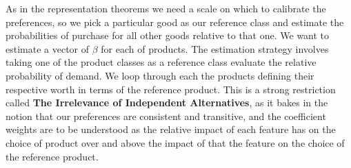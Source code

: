\documentclass[]{tufte-book}
\theoremstyle{definition}
\theoremstyle{definition}
\theoremstyle{definition}
\theoremstyle{remark}
\begin{document}
As in the representation theorems we need a scale on which to calibrate the preferences, so we pick a particular good as our reference class and estimate the probabilities of purchase for all other goods relative to that one. We want to estimate a vector of \(\beta\) for each of products. The estimation strategy involves taking one of the product classes as a reference class evaluate the relative probability of demand. We loop through each the products defining their respective worth in terms of the reference product. This is a strong restriction called \textbf{The Irrelevance of Independent Alternatives}, as it bakes in the notion that our preferences are consistent and transitive, and the coefficient weights are to be understood as the relative impact of each feature has on the choice of product over and above the impact of that the feature on the choice of the reference product.
\end{document}
